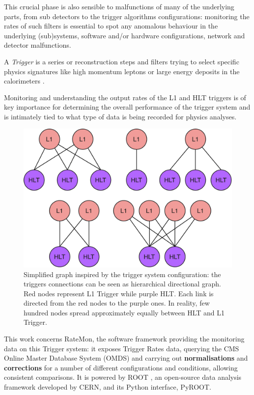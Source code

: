 \documentclass[a4, oneside, 11pt, nobib]{memoir}
\begin{document}
		This crucial phase is also sensible to malfunctions of many of the underlying parts, from sub detectors to the trigger algorithms configurations: monitoring the rates of such filters is essential to spot any anomalous behaviour in the underlying (sub)systems, software and/or hardware configurations, network and detector malfunctions.
		
		A \textit{Trigger} is a series or reconstruction steps and filters trying to select specific physics signatures like high momentum leptons or large energy deposits in the calorimeters \cite{TriggeringandDataAcquisitionCMSExperiment-2020-10-12}.

		Monitoring and understanding the output rates of the L1 and HLT triggers is of key importance for determining the overall performance of the trigger system and is intimately tied to what type of data is being recorded for physics analyses.


\begin{figure}[H]
    \centerline{
        \includegraphics[width=0.35\paperwidth]{figures/triggers.pdf}}
    \caption{Simplified graph inspired by the trigger system configuration: the triggers connections can be seen as hierarchical directional graph. Red nodes represent L1 Trigger while purple HLT. Each link is directed from the red nodes to the purple ones. In reality, few hundred nodes spread approximately equally between HLT and L1 Trigger. \cite{adpol-cvae}}
    \label{fig:triggers}
\end{figure}



		This work concerns RateMon, the software framework providing the monitoring data on this Trigger system: it exposes Trigger Rates data, querying the CMS Online Master Database System (OMDS) and carrying out \textbf{normalisations} and \textbf{corrections} for a number of different configurations and conditions, allowing consistent comparisons. It is powered by ROOT \cite{Brun:1997pa}, an open-source data analysis framework developed by CERN, and its Python interface, PyROOT.
\end{document}
